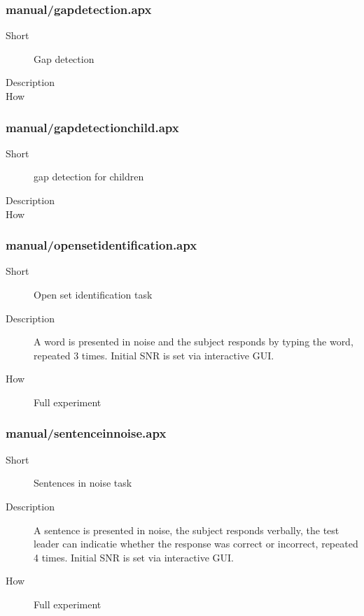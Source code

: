 \subsubsection{manual/gapdetection.apx}
\begin{description}
\item[Short] 
 Gap detection
\item[Description] 

\item[How] 

\end{description}

\subsubsection{manual/gapdetectionchild.apx}
\begin{description}
\item[Short] 
 gap detection for children
\item[Description] 

\item[How] 

\end{description}

\subsubsection{manual/opensetidentification.apx}
\begin{description}
\item[Short] 
 Open set identification task
\item[Description] 
 A word is presented in noise and the subject responds by typing the word, repeated 3 times. Initial SNR is set via interactive GUI.
\item[How] 
 Full experiment
\end{description}

\subsubsection{manual/sentenceinnoise.apx}
\begin{description}
\item[Short] 
 Sentences in noise task
\item[Description] 
 A sentence is presented in noise, the subject responds verbally, the test leader can indicatie whether the response was correct or incorrect, repeated 4 times. Initial SNR is set via interactive GUI.
\item[How] 
 Full experiment
\end{description}


